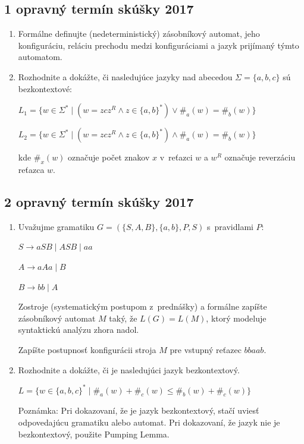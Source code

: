 \documentclass[11pt,a4paper]{article}
\begin{document}
		\subsection{1 opravný termín skúšky 2017}

		\begin{enumerate}
			\item Formálne definujte (nedeterministický) zásobníkový automat, jeho konfiguráciu, reláciu prechodu medzi konfiguráciami a jazyk prijímaný týmto automatom.

			\item Rozhodnite a dokážte, či nasledujúce jazyky nad abecedou $\Sigma = \{a,b,c\}$ sú bezkontextové:
	
			$L_1 = \{w \in \Sigma^* \mid (w = zcz^R \land z \in \{a,b\}^*) \lor \#_a(w) = \#_b(w)\}$
	
			$L_2 = \{w \in \Sigma^* \mid (w = zcz^R \land z \in \{a,b\}^*) \land \#_a(w) = \#_b(w)\}$
	
			kde $\#_x(w)$ označuje počet znakov $x$ v~reťazci $w$ a $w^R$ označuje reverzáciu reťazca $w$.
		\end{enumerate}

		\subsection{2 opravný termín skúšky 2017}

		\begin{enumerate}
			\item Uvažujme gramatiku $G = (\{S,A,B\}, \{a,b\}, P, S)$ s~pravidlami $P$:

			$S \rightarrow aSB \mid ASB \mid aa$
	
			$A \rightarrow aAa \mid B$
	
			$B \rightarrow bb \mid A$
	
			Zostroje (systematickým postupom z~prednášky) a formálne zapíšte zásobníkový automat $M$ taký, že $L(G) = L(M)$, ktorý modeluje syntaktickú analýzu zhora nadol.
	
			Zapíšte postupnosť konfigurácii stroja $M$ pre vstupný reťazec $bbaab$.
	
			\item Rozhodnite a dokážte, či je nasledujúci jazyk bezkontextový.
	
			$L = \{w \in \{a,b,c\}^* \mid \#_a(w) + \#_c(w) \leq  \#_b(w) +  \#_c(w)\}$
	
			Poznámka: Pri dokazovaní, že je jazyk bezkontextový, stačí uviesť odpovedajúcu gramatiku alebo automat. Pri dokazovaní, že jazyk nie je bezkontextový, použite Pumping Lemma.
		\end{enumerate}
\end{document}
